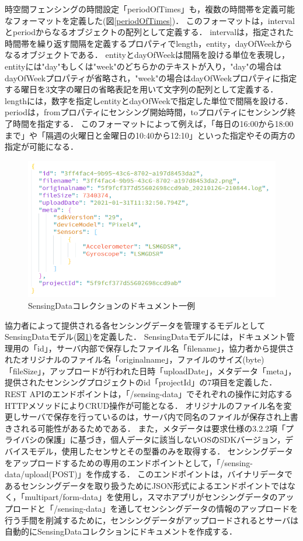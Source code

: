時空間フェンシングの時間設定「periodOfTimes」も，複数の時間帯を定義可能なフォーマットを定義した(図\ref{periodOfTimes})．
このフォーマットは，intervalとperiodからなるオブジェクトの配列として定義する．
intervalは，指定された時間帯を繰り返す間隔を定義するプロパティでlength，entity，dayOfWeekからなるオブジェクトである．
entityとdayOfWeekは間隔を設ける単位を表現し，entityには"day"もしくは"week"のどちらかのテキストが入り，"day"の場合はdayOfWeekプロパティが省略され，"week"の場合はdayOfWeekプロパティに指定する曜日を3文字の曜日の省略表記を用いて文字列の配列として定義する．
lengthには，数字を指定しentityとdayOfWeekで指定した単位で間隔を設ける．
periodは，fromプロパティにセンシング開始時間，toプロパティにセンシング終了時間を指定する．
このフォーマットによって例えば，「毎日の16:00から18:00まで」や「隔週の火曜日と金曜日の10:40から12:10」といった指定やその両方の指定が可能になる．

\begin{figure}[H]
  \centering
  \includegraphics[width=120mm]{SensingData.png}
  \caption{SensingDataコレクションのドキュメント一例}
  \label{SensingData}
\end{figure}

協力者によって提供される各センシングデータを管理するモデルとしてSensingDataモデル(図\ref{SensingData})を定義した．
SensingDataモデルには，ドキュメント管理用の「id」，サーバ内部で保存したファイル名「filename」，協力者から提供されたオリジナルのファイル名「originalname」，ファイルのサイズ(byte)「fileSize」，アップロードが行われた日時「uploadDate」，メタデータ「meta」，提供されたセンシングプロジェクトのid「projectId」の7項目を定義した．
REST APIのエンドポイントは，「/sensing-data」でそれぞれの操作に対応するHTTPメソッドによりCRUD操作が可能となる．
オリジナルのファイル名を変更しサーバで保存を行っているのは，サーバ内で同名のファイルが保存され上書きされる可能性があるためである．
また，メタデータは要求仕様の3.2.2項「プライバシの保護」に基づき，個人データに該当しないOSのSDKバージョン，デバイスモデル，使用したセンサとその型番のみを取得する．
センシングデータをアップロードするための専用のエンドポイントとして，「/sensing-data/upload(POST)」を作成する．
このエンドポイントは，バイナリデータであるセンシングデータを取り扱うためにJSON形式によるエンドポイントではなく，「multipart/form-data」を使用し，スマホアプリがセンシングデータのアップロードと「/sensing-data」を通してセンシングデータの情報のアップロードを行う手間を削減するために，センシングデータがアップロードされるとサーバは自動的にSensingDataコレクションにドキュメントを作成する．

